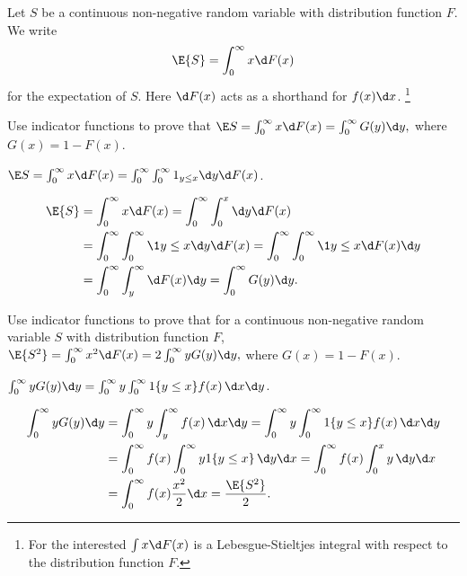 Let $S$ be a continuous non-negative random variable with distribution function $F$.  We write 
\begin{equation*}
  \E{S} = \int_0^\infty x \d F(x)
\end{equation*}
for the expectation of $S$. Here $\d F(x)$ acts as a shorthand for $f(x) \d x$. \footnote{For the interested $\int x \d F(x)$ is a Lebesgue-Stieltjes integral with respect to the distribution function $F$.}

\begin{exercise}
 Use indicator functions to prove that 
$   \E S = \int_0^\infty x \d F(x)  = \int_0^\infty G(y) \d y,$
where $G(x) = 1 - F(x)$. 
\begin{hint}
$\E S = \int_0^\infty x \d F(x)  = \int_0^\infty \int_0^\infty 1_{y\leq x} \d y \d F(x)$.
\end{hint}
\begin{solution}
\begin{equation*}
  \begin{split}
    \E{S} &= \int_0^\infty x \d F(x)  = \int_0^\infty \int_0^x \d y \d F(x) \\
    & = \int_0^\infty \int_0^\infty \1{y\leq x} \d y \d F(x)   = \int_0^\infty \int_0^\infty \1{y\leq x} \d F(x) \d y\\
    & = \int_0^\infty \int_y^\infty \d F(x) \d y = \int_0^\infty G(y) \d y.
  \end{split}
\end{equation*}
\end{solution}
\end{exercise}

\begin{exercise}
 Use indicator functions to prove that for a continuous non-negative random
    variable $S$ with distribution function $F$, 
$    \E{S^2} = \int_0^\infty x^2 \d F(x)  = 2 \int_0^\infty y G(y) \d y,$
where $G(x) = 1 - F(x)$. 
\begin{hint}
$\int_0^\infty y G(y) \d y = \int_0^\infty y \int_0^\infty 1\{y\leq x\}f(x)\, \d x \d y$.
\end{hint}
\begin{solution}
  \begin{align*}
\int_0^\infty y G(y) \d y 
&=  \int_0^\infty y \int_y^\infty f(x)\, \d x \d y =  \int_0^\infty y \int_0^\infty 1\{y\leq x\}f(x)\, \d x \d y\\
&=  \int_0^\infty f(x) \int_0^\infty y 1\{y \leq x\}\, \d y \d x
=  \int_0^\infty f(x) \int_0^x y\, \d y \d x\\
&=  \int_0^\infty f(x) \frac{x^2}2 \d x =\frac{\E{S^2}}2.
  \end{align*}
\end{solution}
\end{exercise}

